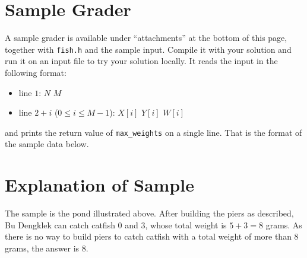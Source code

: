 \section*{Sample Grader}
A sample grader is available under ``attachments'' at the bottom of this page, together with
\texttt{fish.h} and the sample input. Compile it with your solution and run it on an input file to
try your solution locally. It reads the input in the following format:
\begin{itemize}
  \item line $1$: $N$ $M$
  \item line $2 + i$ ($0 \leq i \leq M-1$): $X[i]$ $Y[i]$ $W[i]$
\end{itemize}
and prints the return value of \texttt{max\_weights} on a single line. That is the format of the
sample data below.

\section*{Explanation of Sample}
The sample is the pond illustrated above. After building the piers as described, Bu Dengklek can
catch catfish $0$ and $3$, whose total weight is $5 + 3 = 8$ grams. As there is no way to build piers
to catch catfish with a total weight of more than $8$ grams, the answer is $8$.

